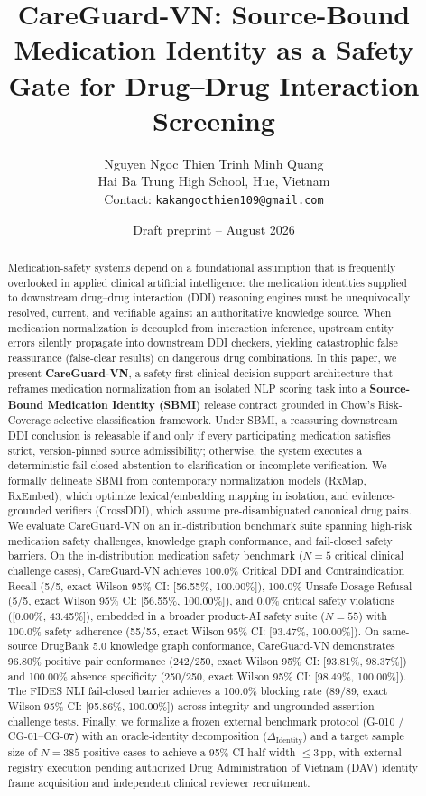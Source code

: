 \documentclass[11pt]{article}
\title{\textbf{CareGuard-VN: Source-Bound Medication Identity as a Safety Gate for Drug--Drug Interaction Screening}}
\author{Nguyen Ngoc Thien \qquad Trinh Minh Quang\\[0.45em]
\small Hai Ba Trung High School, Hue, Vietnam\\
\small Contact: \texttt{kakangocthien109@gmail.com}}
\date{Draft preprint -- August 2026}
\begin{document}
\maketitle

\begin{abstract}
Medication-safety systems depend on a foundational assumption that is frequently overlooked in applied clinical artificial intelligence: the medication identities supplied to downstream drug--drug interaction (DDI) reasoning engines must be unequivocally resolved, current, and verifiable against an authoritative knowledge source. When medication normalization is decoupled from interaction inference, upstream entity errors silently propagate into downstream DDI checkers, yielding catastrophic false reassurance (false-clear results) on dangerous drug combinations. In this paper, we present \textbf{CareGuard-VN}, a safety-first clinical decision support architecture that reframes medication normalization from an isolated NLP scoring task into a \textbf{Source-Bound Medication Identity (SBMI)} release contract grounded in Chow's Risk-Coverage selective classification framework. Under SBMI, a reassuring downstream DDI conclusion is releasable if and only if every participating medication satisfies strict, version-pinned source admissibility; otherwise, the system executes a deterministic fail-closed abstention to clarification or incomplete verification. We formally delineate SBMI from contemporary normalization models (RxMap, RxEmbed), which optimize lexical/embedding mapping in isolation, and evidence-grounded verifiers (CrossDDI), which assume pre-disambiguated canonical drug pairs. 
We evaluate CareGuard-VN on an in-distribution benchmark suite spanning high-risk medication safety challenges, knowledge graph conformance, and fail-closed safety barriers. On the in-distribution medication safety benchmark ($N=5$ critical clinical challenge cases), CareGuard-VN achieves 100.0\% Critical DDI and Contraindication Recall (5/5, exact Wilson 95\% CI: [56.55\%, 100.00\%]), 100.0\% Unsafe Dosage Refusal (5/5, exact Wilson 95\% CI: [56.55\%, 100.00\%]), and 0.0\% critical safety violations ([0.00\%, 43.45\%]), embedded in a broader product-AI safety suite ($N=55$) with 100.0\% safety adherence (55/55, exact Wilson 95\% CI: [93.47\%, 100.00\%]). On same-source DrugBank 5.0 knowledge graph conformance, CareGuard-VN demonstrates 96.80\% positive pair conformance (242/250, exact Wilson 95\% CI: [93.81\%, 98.37\%]) and 100.00\% absence specificity (250/250, exact Wilson 95\% CI: [98.49\%, 100.00\%]). The FIDES NLI fail-closed barrier achieves a 100.0\% blocking rate (89/89, exact Wilson 95\% CI: [95.86\%, 100.00\%]) across integrity and ungrounded-assertion challenge tests. Finally, we formalize a frozen external benchmark protocol (G-010 / CG-01--CG-07) with an oracle-identity decomposition ($\Delta_{\text{Identity}}$) and a target sample size of $N=385$ positive cases to achieve a 95\% CI half-width $\le 3\,\text{pp}$, with external registry execution pending authorized Drug Administration of Vietnam (DAV) identity frame acquisition and independent clinical reviewer recruitment.
\end{abstract}
\end{document}

